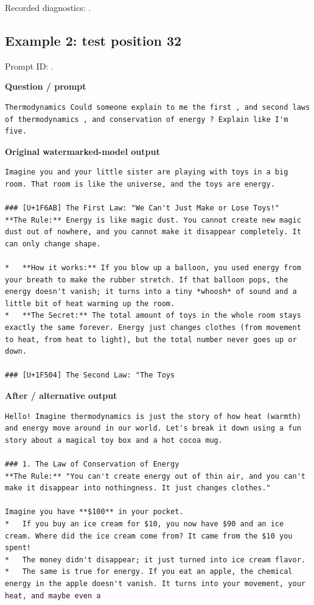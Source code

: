 Recorded diagnostics:
\texttt{}.

\subsection{Example 2: test position
32}\label{record-docs-watermarking-qualitative-text-textseal2-direct-topk-md-example-2-test-position-32}

Prompt ID:
\texttt{}.

\textbf{Question / prompt}

\begin{Verbatim}
Thermodynamics Could someone explain to me the first , and second laws of thermodynamics , and conservation of energy ? Explain like I'm five.
\end{Verbatim}

\textbf{Original watermarked-model output}

\begin{Verbatim}
Imagine you and your little sister are playing with toys in a big room. That room is like the universe, and the toys are energy.

### [U+1F6AB] The First Law: "We Can't Just Make or Lose Toys!"
**The Rule:** Energy is like magic dust. You cannot create new magic dust out of nowhere, and you cannot make it disappear completely. It can only change shape.

*   **How it works:** If you blow up a balloon, you used energy from your breath to make the rubber stretch. If that balloon pops, the energy doesn't vanish; it turns into a tiny *whoosh* of sound and a little bit of heat warming up the room.
*   **The Secret:** The total amount of toys in the whole room stays exactly the same forever. Energy just changes clothes (from movement to heat, from heat to light), but the total number never goes up or down.

### [U+1F504] The Second Law: "The Toys
\end{Verbatim}

\textbf{After / alternative output}

\begin{Verbatim}
Hello! Imagine thermodynamics is just the story of how heat (warmth) and energy move around in our world. Let's break it down using a fun story about a magical toy box and a hot cocoa mug.

### 1. The Law of Conservation of Energy
**The Rule:** "You can't create energy out of thin air, and you can't make it disappear into nothingness. It just changes clothes."

Imagine you have **$100** in your pocket.
*   If you buy an ice cream for $10, you now have $90 and an ice cream. Where did the ice cream come from? It came from the $10 you spent!
*   The money didn't disappear; it just turned into ice cream flavor.
*   The same is true for energy. If you eat an apple, the chemical energy in the apple doesn't vanish. It turns into your movement, your heat, and maybe even a
\end{Verbatim}

